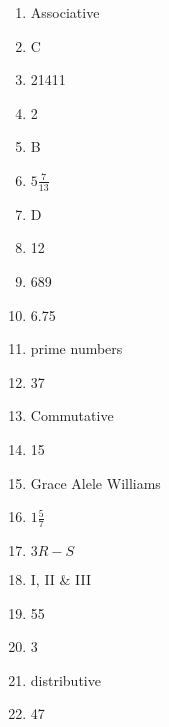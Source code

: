 \documentclass[../uilmath.tex]{subfiles}
\begin{document}
\begin{enumerate}[label=\bfseries\arabic*.]
    \item %
    Associative 

    \item %
    C  

    \item %
    21411

    \item %
    2

    \item %
    B 

    \item %
    $5 \frac{7}{13}$

    \item %
    D 

    \item %
    12 

    \item %
    689

    \item %
    6.75

    \item %
    prime numbers 

    \item %
    37

    \item %
    Commutative

    \item %
    15

    \item %
    Grace Alele Williams 

    \item %
    $1\frac{5}{7}$

    \item %
    $3R-S$

    \item %
    I, II \& III 

    \item %
    55

    \item %
    3

    \item %
    distributive 

    \item %
    47


\end{enumerate}
\end{document}
